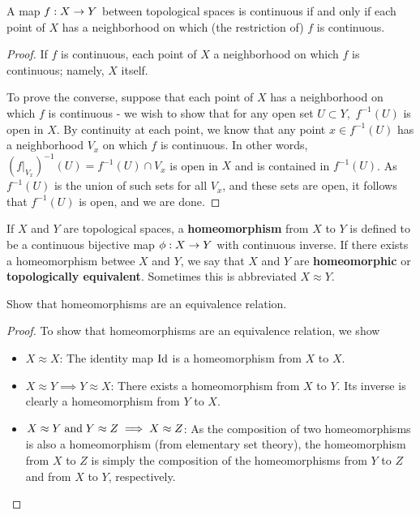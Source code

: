 \documentclass{mathnotes}
\begin{document}
\begin{lem}
    A map $f:X\rightarrow Y$ between topological spaces is continuous if and only if each point of $X$ has a neighborhood on which
    (the restriction of) $f$ is continuous.
\end{lem}
\begin{proof}
    If $f$ is continuous, each point of $X$ a neighborhood on which $f$ is continuous; namely, $X$ itself.
    
    To prove the converse, suppose that each point of $X$ has a neighborhood on which $f$ is continuous - we wish to show that for any
    open set $U\subset Y,$ $f^{-1}(U)$ is open in $X$. By continuity at each point, we know that any point $x\in f^{-1}(U)$ has a neighborhood
    $V_x$ on which $f$ is continuous. In other words, $(f|_{V_x})^{-1}(U)=f^{-1}(U)\cap V_x$ is open in $X$ and is contained in $f^{-1}(U)$.
    As $f^{-1}(U)$ is the union of such sets for all $V_x$, and these sets are open, it follows that $f^{-1}(U)$ is open, and we are done.
\end{proof}

\begin{defn}
    If $X$ and $Y$ are topological spaces, a \textbf{homeomorphism} from $X$ to $Y$ is defined to be a continuous bijective map
    $\phi:X\rightarrow Y$ with continuous inverse. If there exists a homeomorphism betwee $X$ and $Y$, we say that $X$ and $Y$ are \textbf{homeomorphic}
    or \textbf{topologically equivalent}. Sometimes this is abbreviated $X\approx Y$.
\end{defn}

\begin{exc}
    Show that homeomorphisms are an equivalence relation.
\end{exc}
\begin{proof}
    To show that homeomorphisms are an equivalence relation, we show
    \begin{itemize}
        \item $X\approx X$: The identity map $\operatorname{Id}$ is a homeomorphism from $X$ to $X$.
        \item $X\approx Y \implies Y\approx X$: There exists a homeomorphism from $X$ to $Y$. Its inverse is clearly
            a homeomorphism from $Y$ to $X$.
        \item $X\approx Y \;\textnormal{and}\; Y\approx Z \implies X\approx Z$: As the composition of two homeomorphisms is also a homeomorphism
            (from elementary set theory), the homeomorphism from $X$ to $Z$ is simply the composition of the homeomorphisms
            from $Y$ to $Z$ and from $X$ to $Y$, respectively.
    \end{itemize}
\end{proof}
\end{document}
